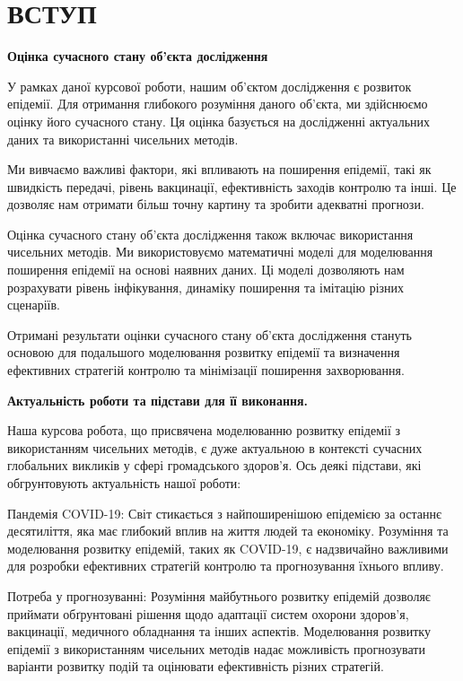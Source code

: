 \chapter*{ВСТУП}

\textbf{Оцінка сучасного стану об’єкта дослідження}


У рамках даної курсової роботи, нашим об'єктом дослідження є розвиток епідемії. Для отримання глибокого розуміння даного об'єкта, ми здійснюємо оцінку його сучасного стану. Ця оцінка базується на дослідженні актуальних даних та використанні чисельних методів.

Ми вивчаємо важливі фактори, які впливають на поширення епідемії, такі як швидкість передачі, рівень вакцинації, ефективність заходів контролю та інші. Це дозволяє нам отримати більш точну картину та зробити адекватні прогнози.

Оцінка сучасного стану об'єкта дослідження також включає використання чисельних методів. Ми використовуємо математичні моделі для моделювання поширення епідемії на основі наявних даних. Ці моделі дозволяють нам розрахувати рівень інфікування, динаміку поширення та імітацію різних сценаріїв.

Отримані результати оцінки сучасного стану об'єкта дослідження стануть основою для подальшого моделювання розвитку епідемії та визначення ефективних стратегій контролю та мінімізації поширення захворювання.


\textbf{Актуальність роботи та підстави для її виконання.}

Наша курсова робота, що присвячена моделюванню розвитку епідемії з використанням чисельних методів, є дуже актуальною в контексті сучасних глобальних викликів у сфері громадського здоров'я. Ось деякі підстави, які обгрунтовують актуальність нашої роботи:

    Пандемія COVID-19: Світ стикається з найпоширенішою епідемією за останнє десятиліття, яка має глибокий вплив на життя людей та економіку. Розуміння та моделювання розвитку епідемій, таких як COVID-19, є надзвичайно важливими для розробки ефективних стратегій контролю та прогнозування їхнього впливу.

    Потреба у прогнозуванні: Розуміння майбутнього розвитку епідемій дозволяє приймати обґрунтовані рішення щодо адаптації систем охорони здоров'я, вакцинації, медичного обладнання та інших аспектів. Моделювання розвитку епідемії з використанням чисельних методів надає можливість прогнозувати варіанти розвитку подій та оцінювати ефективність різних стратегій.

